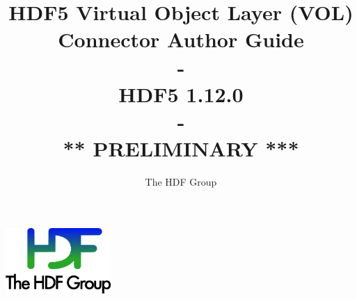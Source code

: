 \documentclass[10pt,a4paper]{article}
\title{HDF5 Virtual Object Layer (VOL) Connector Author Guide\\
    -\\
    \large HDF5 1.12.0\\
    -\\
    \large *** PRELIMINARY ***}
\author{The HDF Group}
\begin{document}
\maketitle
\thispagestyle{empty}

\vfill
\begin{center}
\includegraphics[width=4cm]{THG_LOGO.pdf} %
\end{center}
\vfill
\vfill

\newpage
{}
\tableofcontents
\newpage


\renewcommand\appendixtocname{Appendix}







\end{document}
